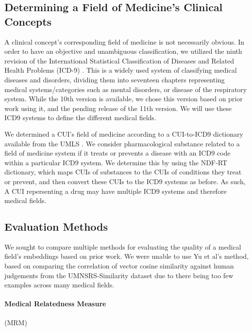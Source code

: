 \documentclass[11pt,a4paper]{article}
\begin{document}
\subsection{Determining a Field of Medicine's Clinical Concepts}
A clinical concept's corresponding field of medicine is not necessarily obvious. In order to have an objective and unambiguous classification, we utilized the ninth revision of the International Statistical Classification of Diseases and Related Health Problems (ICD-9) \cite{sleeInternationalClassificationDiseases1978}. This is a widely used system of classifying medical diseases and disorders, dividing them into seventeen chapters representing medical systems/categories such as mental disorders, or disease of the respiratory system. While the 10th version is available, we chose this version based on prior work using it, and the pending release of the 11th version. We will use these ICD9 systems to define the different medical fields. 

We determined a CUI's field of medicine according to a CUI-to-ICD9 dictionary available from the UMLS \cite{bodenreiderUnifiedMedicalLanguage2004}. We consider pharmacological substance related to a field of medicine system if it treats or prevents a disease with an ICD9 code within a particular ICD9 system. We determine this by using the NDF-RT dictionary, which maps CUIs of substances to the CUIs of conditions they treat or prevent, and then convert these CUIs to the ICD9 systems as before.  As such, A CUI repersenting a drug may have multiple ICD9 systems and therefore medical fields. 

\subsection{Evaluation Methods}

We sought to compare multiple methods for evaluating the quality of a medical field's embeddings based on prior work. We were unable to use Yu et al's  method, based on comparing the correlation of vector cosine similarity against human judgements from the UMNSRS-Similarity dataset \cite{pakhomovSemanticRelatednessSimilarity2018} due to there being too few examples across many medical fields. 

\paragraph{Medical Relatedness Measure}(MRM)
\end{document}
